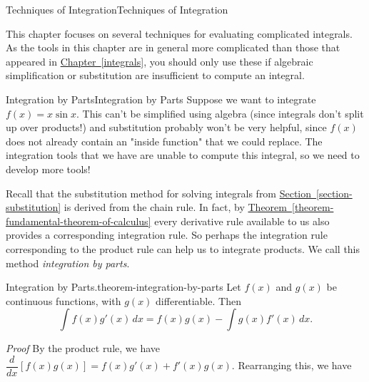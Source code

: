 \documentclass[10pt,]{book}
\makeatletter
\renewcommand*{\proofname}{Proof}
\renewenvironment{proof}[1][\proofname]{\par
  \pushQED{\qed}%
  \normalfont \topsep6\p@\@plus6\p@\relax
  \trivlist
  \item\relax
    {\itshape
    #1\@addpunct{.}}\hspace\labelsep\ignorespaces
}{%
  \popQED\endtrivlist\@endpefalse
}
\numberwithin{equation}{section}
\newcommand{\dv}[3][]{\dfrac{d^{#1} #2}{d #3^{#1}}}
\makeatother
\begin{document}
\begin{chapterptx}{Techniques of Integration}{}{Techniques of Integration}{}{}\label{techniques-of-integration}
\begin{introduction}{}%
\hypertarget{p-494}{}%
This chapter focuses on several techniques for evaluating complicated integrals. As the tools in this chapter are in general more complicated than those that appeared in \hyperref[integrals]{Chapter~\ref{integrals}}, you should only use these if algebraic simplification or substitution are insufficient to compute an integral.%
\end{introduction}%
%
%
\typeout{************************************************}
\typeout{************************************************}
%
\begin{sectionptx}{Integration by Parts}{}{Integration by Parts}{}{}\label{section-integration-by-parts}
\hypertarget{p-495}{}%
Suppose we want to integrate \(f(x) = x\sin x\). This can't be simplified using algebra (since integrals don't split up over products!) and substitution probably won't be very helpful, since \(f(x)\) does not already contain an "inside function" that we could replace. The integration tools that we have are unable to compute this integral, so we need to develop more tools!%
\par
\hypertarget{p-496}{}%
Recall that the substitution method for solving integrals from \hyperref[section-substitution]{Section~\ref{section-substitution}} is derived from the chain rule. In fact, by \hyperref[theorem-fundamental-theorem-of-calculus]{Theorem~\ref{theorem-fundamental-theorem-of-calculus}} every derivative rule available to us also provides a corresponding integration rule. So perhaps the integration rule corresponding to the product rule can help us to integrate products. We call this method \emph{integration by parts}.%
\begin{theorem}{Integration by Parts.}{}{theorem-integration-by-parts}%
\hypertarget{p-497}{}%
Let \(f(x)\) and \(g(x)\) be continuous functions, with \(g(x)\) differentiable. Then%
%
\begin{equation*}
\int f(x)g'(x)\,dx = f(x)g(x) - \int g(x)f'(x)\,dx.
\end{equation*}
\end{theorem}
\begin{proof}\hypertarget{proof-12}{}
\hypertarget{p-498}{}%
By the product rule, we have \(\dv{}{x}[f(x)g(x)] = f(x)g'(x) + f'(x)g(x)\). Rearranging this, we have%

\end{proof}
\end{sectionptx}
\end{chapterptx}
\end{document}

